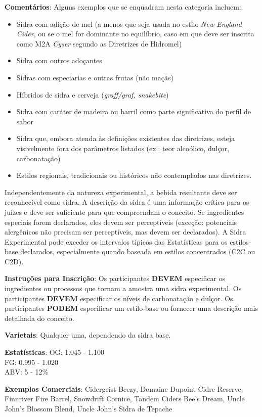 \textbf{Comentários}: Alguns exemplos que se enquadram nesta categoria incluem:
\begin{itemize}[leftmargin=3mm]
\item Sidra com adição de mel (a menos que seja usada no estilo \textit{New England Cider}, ou se o mel for dominante no equilíbrio, caso em que deve ser inscrita como M2A \textit{Cyser} segundo as Diretrizes de Hidromel)
\item Sidra com outros adoçantes
\item Sidras com especiarias e outras frutas (não maçãs)
\item Híbridos de sidra e cerveja (\textit{graff/graf, snakebite})
\item Sidra com caráter de madeira ou barril como parte significativa do perfil de sabor
\item Sidra que, embora atenda às definições existentes das diretrizes, esteja visivelmente fora dos parâmetros listados (ex.: teor alcoólico, dulçor, carbonatação)
\item Estilos regionais, tradicionais ou históricos não contemplados nas diretrizes.
\end{itemize}
Independentemente da natureza experimental, a bebida resultante deve ser reconhecível como sidra. A descrição da sidra é uma informação crítica para os juízes e deve ser suficiente para que compreendam o conceito. Se ingredientes especiais forem declarados, eles devem ser perceptíveis (exceção: potenciais alergênicos não precisam ser perceptíveis, mas devem ser declarados).  
A Sidra Experimental pode exceder os intervalos típicos das Estatísticas para os estilos-base declarados, especialmente quando baseada em estilos concentrados (C2C ou C2D).

\textbf{Instruções para Inscrição}: Os participantes \textbf{DEVEM} especificar os ingredientes ou processos que tornam a amostra uma sidra experimental. Os participantes \textbf{DEVEM} especificar os níveis de carbonatação e dulçor. Os participantes \textbf{PODEM} especificar um estilo-base ou fornecer uma descrição mais detalhada do conceito.

\textbf{Varietais}: Qualquer uma, dependendo da sidra base.

\textbf{Estatísticas}: OG: 1.045 - 1.100 \\
\phantom{ } \hspace{16.5mm} FG: 0.995 - 1.020 \\
\phantom{ } \hspace{16.5mm} ABV: 5 - 12\%

\textbf{Exemplos Comerciais}: Cidergeist Beezy, Domaine Dupoint Cidre Reserve, Finnriver Fire Barrel, Snowdrift Cornice, Tandem Ciders Bee's Dream, Uncle John's Blossom Blend, Uncle John's Sidra de Tepache